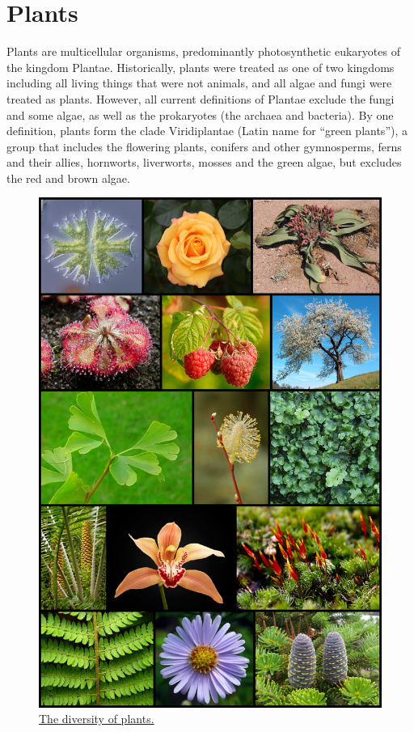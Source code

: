 \hypertarget{plants}{%
\chapter{Plants}\label{plants}}

Plants are multicellular organisms, predominantly photosynthetic eukaryotes of the kingdom Plantae. Historically, plants were treated as one of two kingdoms including all living things that were not animals, and all algae and fungi were treated as plants. However, all current definitions of Plantae exclude the fungi and some algae, as well as the prokaryotes (the archaea and bacteria). By one definition, plants form the clade Viridiplantae (Latin name for ``green plants''), a group that includes the flowering plants, conifers and other gymnosperms, ferns and their allies, hornworts, liverworts, mosses and the green algae, but excludes the red and brown algae.



\begin{figure}

{\centering \includegraphics[width=0.7\linewidth]{./figures/plants/Diversity_of_plants_image_version_5} 

}

\caption{\href{https://commons.wikimedia.org/wiki/File:Diversity_of_plants_image_version_5.png}{The diversity of plants.}}\label{fig:plantdiversity}
\end{figure}

